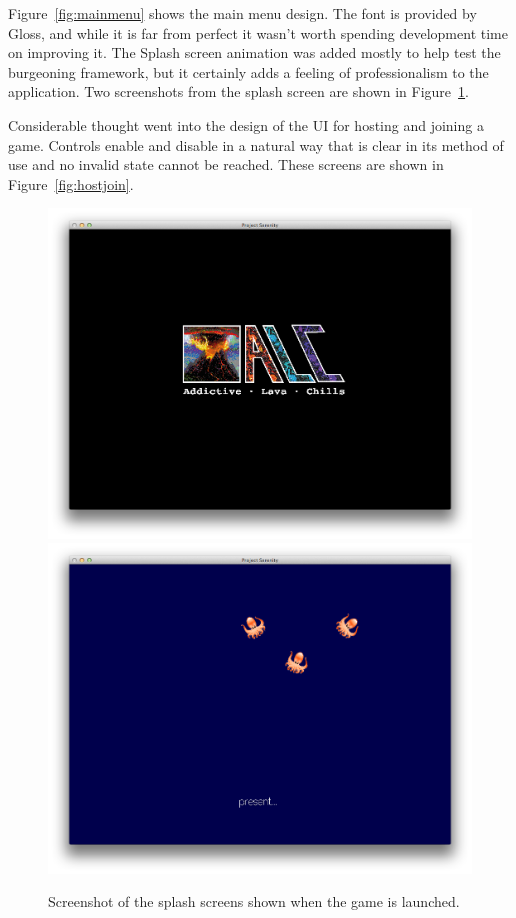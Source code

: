 Figure~\ref{fig:mainmenu} shows the main menu design. The font is provided by Gloss, and while it is far from perfect it wasn't worth spending development time on improving it. The Splash screen animation was added mostly to help test the burgeoning framework, but it certainly adds a feeling of professionalism to the application. Two screenshots from the splash screen are shown in Figure~\ref{fig:splash}.

Considerable thought went into the design of the UI for hosting and joining a game. Controls enable and disable in a natural way that is clear in its method of use and no invalid state cannot be reached. These screens are shown in Figure~\ref{fig:hostjoin}.

\begin{figure}[p]
	\includegraphics[width=15.5cm]{res/serenityscreens/07-splash1}
	\includegraphics[width=15.5cm]{res/serenityscreens/08-splash2}
	\caption[Splash screens shown on launch]{Screenshot of the splash screens shown when the game is launched.}
	\label{fig:splash}
\end{figure}

